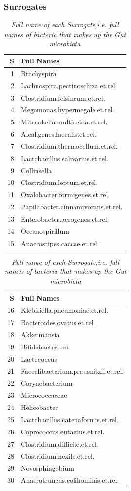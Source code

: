 \documentclass[a4paper,12pt]{article}
\begin{document}
	\subsubsection*{Surrogates}
	\begin{table}[H]
		\centering
		\begin{tabular}{rl}
			\hline
			S & Full Names \\ 
			\hline
			1 & Brachyspira \\ 
			2 & Lachnospira.pectinoschiza.et.rel. \\ 
			3 & Clostridium.felsineum.et.rel. \\ 
			4 & Megamonas.hypermegale.et.rel. \\ 
			5 & Mitsuokella.multiacida.et.rel. \\ 
			6 & Alcaligenes.faecalis.et.rel. \\ 
			7 & Clostridium.thermocellum.et.rel. \\ 
			8 & Lactobacillus.salivarius.et.rel. \\ 
			9 & Collinsella \\ 
			10 & Clostridium.leptum.et.rel. \\ 
			11 & Oxalobacter.formigenes.et.rel. \\ 
			12 & Papillibacter.cinnamivorans.et.rel. \\ 
			13 & Enterobacter.aerogenes.et.rel. \\ 
			14 & Oceanospirillum \\ 
			15 & Anaerostipes.caccae.et.rel. \\
			\hline
		\end{tabular}
		\quad
		\begin{tabular}{rl}
			\hline
			S & Full Names \\ 
			\hline
			16 & Klebisiella.pneumoniae.et.rel. \\ 
			17 & Bacteroides.ovatus.et.rel. \\ 
			18 & Akkermansia \\ 
			19 & Bifidobacterium \\ 
			20 & Lactococcus \\ 
			21 & Faecalibacterium.prausnitzii.et.rel. \\ 
			22 & Corynebacterium \\ 
			23 & Micrococcaceae \\ 
			24 & Helicobacter \\ 
			25 & Lactobacillus.catenaformis.et.rel. \\ 
			26 & Coprococcus.eutactus.et.rel. \\ 
			27 & Clostridium.difficile.et.rel. \\ 
			28 & Clostridium.nexile.et.rel. \\ 
			29 & Novosphingobium \\ 
			30 & Anaerotruncus.colihominis.et.rel. \\ 
			\hline
		\end{tabular}
		\caption{\emph{Full name of each Surrogate,i.e. full names of bacteria that makes up the Gut microbiota}}
	\end{table}
	
\end{document}
